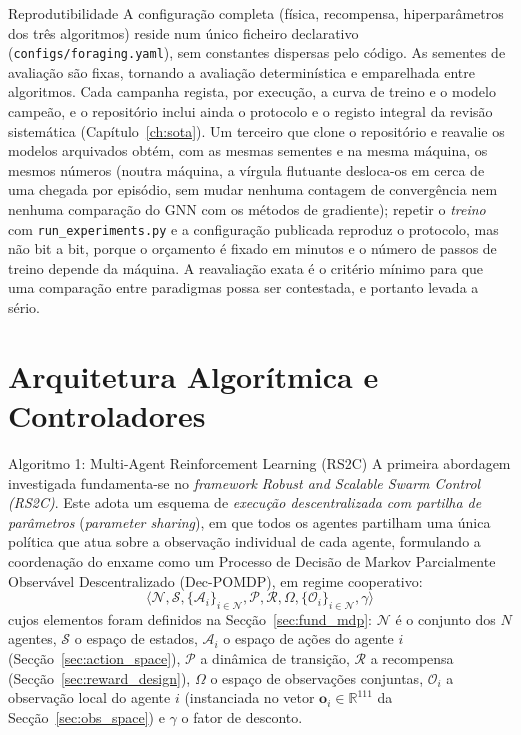\documentclass[12pt,reqno, twoside]{amsbook}
\makeatletter
\def\section{\@startsection{section}{1}%
      \z@{.5\linespacing\@plus.7\linespacing}{.25\linespacing}%
      {\normalfont\bfseries\flushleft}}
\def\subsection{\@startsection{subsection}{2}%
      \z@{.5\linespacing\@plus.7\linespacing}{.25\linespacing}%
      {\normalfont\bfseries\flushleft}}
\theoremstyle{plain}
\numberwithin{equation}{chapter}
\numberwithin{section}{chapter}
\numberwithin{table}{chapter}
\numberwithin{figure}{chapter}
\makeatother
\begin{document}
\subsection{Reprodutibilidade}
A configuração completa (física, recompensa, hiperparâmetros dos três algoritmos) reside num único ficheiro declarativo (\texttt{configs/foraging.yaml}), sem constantes dispersas pelo código. As sementes de avaliação são fixas, tornando a avaliação determinística e emparelhada entre algoritmos. Cada campanha regista, por execução, a curva de treino e o modelo campeão, e o repositório inclui ainda o protocolo e o registo integral da revisão sistemática (Capítulo~\ref{ch:sota}). Um terceiro que clone o repositório e reavalie os modelos arquivados obtém, com as mesmas sementes e na mesma máquina, os mesmos números (noutra máquina, a vírgula flutuante desloca-os em cerca de uma chegada por episódio, sem mudar nenhuma contagem de convergência nem nenhuma comparação do GNN com os métodos de gradiente); repetir o \emph{treino} com \texttt{run\_experiments.py} e a configuração publicada reproduz o protocolo, mas não bit a bit, porque o orçamento é fixado em minutos e o número de passos de treino depende da máquina. A reavaliação exata é o critério mínimo para que uma comparação entre paradigmas possa ser contestada, e portanto levada a sério.

\chapter{Arquitetura Algorítmica e Controladores}
\label{ch:algorithms}

\section{Algoritmo 1: Multi-Agent Reinforcement Learning (RS2C)}
\label{sec:algo_rl}
A primeira abordagem investigada fundamenta-se no \textit{framework} \emph{Robust and Scalable Swarm Control (RS2C)}. Este adota um esquema de \emph{execução descentralizada com partilha de parâmetros} (\textit{parameter sharing}), em que todos os agentes partilham uma única política que atua sobre a observação individual de cada agente, formulando a coordenação do enxame como um Processo de Decisão de Markov Parcialmente Observável Descentralizado (Dec-POMDP), em regime cooperativo:
\begin{equation}
    \langle \mathcal{N}, \mathcal{S}, \{\mathcal{A}_i\}_{i \in \mathcal{N}}, \mathcal{P}, \mathcal{R}, \Omega, \{\mathcal{O}_i\}_{i \in \mathcal{N}}, \gamma \rangle
\end{equation}
cujos elementos foram definidos na Secção~\ref{sec:fund_mdp}: $\mathcal{N}$ é o conjunto dos $N$ agentes, $\mathcal{S}$ o espaço de estados, $\mathcal{A}_i$ o espaço de ações do agente $i$ (Secção~\ref{sec:action_space}), $\mathcal{P}$ a dinâmica de transição, $\mathcal{R}$ a recompensa (Secção~\ref{sec:reward_design}), $\Omega$ o espaço de observações conjuntas, $\mathcal{O}_i$ a observação local do agente $i$ (instanciada no vetor $\mathbf{o}_i \in \mathbb{R}^{111}$ da Secção~\ref{sec:obs_space}) e $\gamma$ o fator de desconto.
\end{document}
